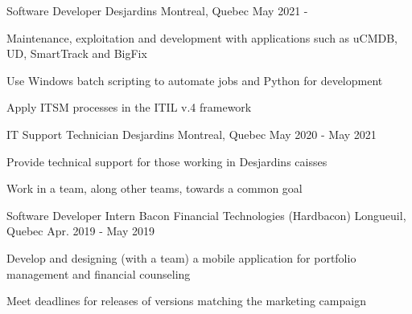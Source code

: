 

\begin{cventries}

  
  \cventry
    {Software Developer} %
    {Desjardins} %
    {Montreal, Quebec} %
    {May 2021 -} %
    {
      \begin{cvitems} %
        \item {Maintenance, exploitation and development with applications such as uCMDB, UD, SmartTrack and BigFix}
        \item {Use Windows batch scripting to automate jobs and Python for development}
        \item {Apply ITSM processes in the ITIL v.4 framework}
      \end{cvitems}
    }
    
  \cventry
    {IT Support Technician} %
    {Desjardins} %
    {Montreal, Quebec} %
    {May 2020 - May 2021} %
    {
      \begin{cvitems} %
        \item {Provide technical support for those working in Desjardins caisses}
        \item {Work in a team, along other teams, towards a common goal}
      \end{cvitems}
    }
    
  \cventry
    {Software Developer Intern} %
    {Bacon Financial Technologies (Hardbacon)} %
    {Longueuil, Quebec} %
    {Apr. 2019 - May 2019} %
    {
      \begin{cvitems} %
        \item {Develop and designing (with a team) a mobile application for portfolio management and financial counseling}
        \item {Meet deadlines for releases of versions matching the marketing campaign}
      \end{cvitems}
    }

\end{cventries}
